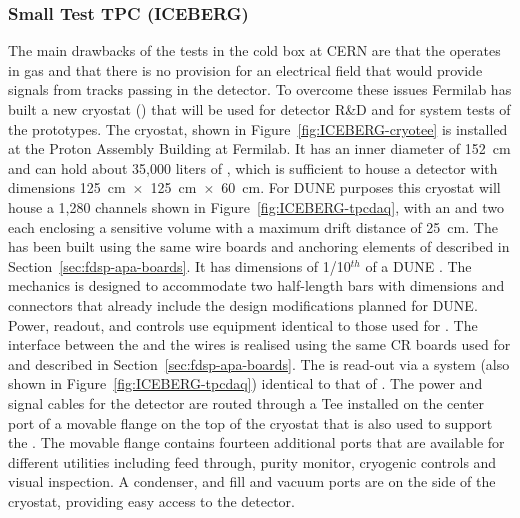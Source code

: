 \subsubsection{Small Test TPC (ICEBERG)}
\label{sec:fdsp-tpcelec-qa-facilities-testtpc}

The main drawbacks of the tests in the cold box at CERN are that the 
operates in gas and that there is no provision for an electrical field that 
would provide signals from tracks passing in the detector. To overcome these 
issues Fermilab has built a new cryostat () that will be used for 
 detector R\&D and for system tests of the  prototypes. 
The  cryostat, shown in Figure~\ref{fig:ICEBERG-cryotee} is installed
at the Proton Assembly Building at Fermilab. It has an inner diameter of \SI{152}{cm}
and can hold about 35,000 liters of , which is sufficient to house a
detector with dimensions \SI{125}{cm}~$\times$~\SI{125}{cm}~$\times$~\SI{60}{cm}. For DUNE 
purposes this cryostat will house a 1,280 channels  shown in
Figure~\ref{fig:ICEBERG-tpcdaq}, with an  and two  each 
enclosing a sensitive volume with a maximum drift distance of \SI{25}{cm}. The  
has been built using the same wire boards and anchoring elements of   
described in Section~\ref{sec:fdsp-apa-boards}. It has dimensions of 
1/10$^{th}$ of a DUNE . The  mechanics is designed to accommodate 
two half-length  bars with dimensions and connectors that already 
include the design modifications planned for DUNE. Power, readout, and controls 
use equipment identical to those used for . The interface between the 
 and the  wires is realised using the same CR boards used 
for  and described in Section~\ref{sec:fdsp-apa-boards}. The  is
read-out via a  system (also shown in Figure~\ref{fig:ICEBERG-tpcdaq})
identical to that of . The power and signal cables for the detector 
are routed through a Tee installed on the center port of a movable flange on the 
top of the cryostat that is also used to support the . The movable 
flange contains fourteen additional ports that are available for different utilities 
including  feed through, purity monitor, cryogenic controls and visual inspection. 
A condenser, and  fill and vacuum ports are on the side of the cryostat, 
providing easy access to the detector.

